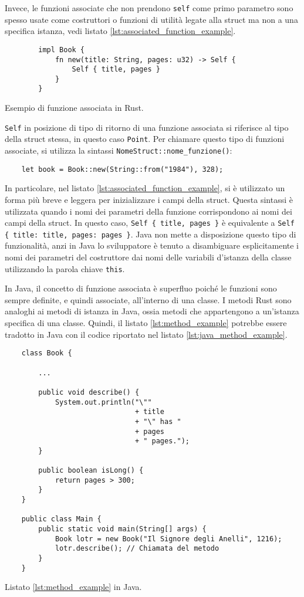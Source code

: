 Invece, le funzioni associate che non prendono \texttt{self} come primo parametro sono spesso usate come costruttori o funzioni di utilità legate alla struct ma non a una specifica istanza, vedi listato \ref{lst:associated_function_example}.
\begin{listing}
    \begin{verbatim}
        impl Book {
            fn new(title: String, pages: u32) -> Self {
                Self { title, pages }
            }
        }
    \end{verbatim}
    \caption{Esempio di funzione associata in Rust.}
    \label{lst:associated_function_example}
\end{listing}
\texttt{Self} in posizione di tipo di ritorno di una funzione associata si riferisce al tipo della struct stessa, in questo caso \texttt{Point}. Per chiamare questo tipo di funzioni associate, si utilizza la sintassi \texttt{NomeStruct::nome\_funzione()}:
\begin{verbatim}
    let book = Book::new(String::from("1984"), 328);
\end{verbatim}
In particolare, nel listato \ref{lst:associated_function_example}, si è utilizzato un forma più breve e leggera per inizializzare i campi della struct. Questa sintassi è utilizzata quando i nomi dei parametri della funzione corrispondono ai nomi dei campi della struct. In questo caso, \texttt{Self \{ title, pages \}} è equivalente a \texttt{Self \{ title: title, pages: pages \}}. Java non mette a disposizione questo tipo di funzionalità, anzi in Java lo sviluppatore è tenuto a disambiguare esplicitamente i nomi dei parametri del costruttore dai nomi delle variabili d'istanza della classe utilizzando la parola chiave \texttt{this}.

In Java, il concetto di funzione associata è superfluo poiché le funzioni sono sempre definite, e quindi associate, all'interno di una classe. I metodi Rust sono analoghi ai metodi di istanza in Java, ossia metodi che appartengono a un'istanza specifica di una classe. Quindi, il listato \ref{lst:method_example} potrebbe essere tradotto in Java con il codice riportato nel listato \ref{lst:java_method_example}.
\begin{listing}
\begin{verbatim}
    class Book {
        
        ...

        public void describe() {
            System.out.println("\"" 
                               + title 
                               + "\" has " 
                               + pages 
                               + " pages.");
        }

        public boolean isLong() {
            return pages > 300;
        }
    }

    public class Main {
        public static void main(String[] args) {
            Book lotr = new Book("Il Signore degli Anelli", 1216);
            lotr.describe(); // Chiamata del metodo
        }
    }
\end{verbatim}
    \caption{Listato \ref{lst:method_example} in Java.}
    \label{lst:java_method_example}
\end{listing}

